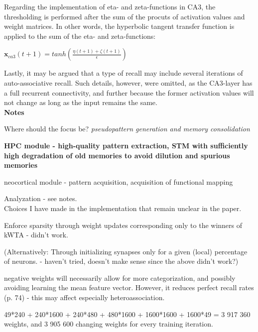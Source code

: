 Regarding the implementation of eta- and zeta-functions in CA3, the thresholding is performed after the sum of the procuts of activation values and weight matrices. In other words, the hyperbolic tangent transfer function is applied to the sum of the eta- and zeta-functions: 

\begin{center}
\begin{math}
    \textbf{x}_{ca3}(t+1) = tanh(\frac{\eta(t+1) + \zeta(t+1)}{\epsilon})
\end{math}
\end{center}

Lastly, it may be argued that a type of recall may include several iterations of auto-associative recall. Such details, however, were omitted, as the CA3-layer has a full recurrent connectivity, and further because the former activation values will not change as long as the input remains the same.
\\

\textbf{Notes}

Where should the focus be? \textit{pseudopattern generation and memory consolidation}

\textbf{HPC module - high-quality pattern extraction, STM with sufficiently high degradation of old memories to avoid dilution and spurious memories}

neocortical module - pattern acquisition, acquisition of functional mapping

Analyzation - see notes.
\\

Choices I have made in the implementation that remain unclear in the paper.

Enforce sparsity through weight updates corresponding only to the winners of kWTA - didn't work.

(Alternatively: Through initializing synapses only for a given (local) percentage of neurons. - haven't tried, doesn't make sense since the above didn't work?)

negative weights will necessarily allow for more categorization, and possibly avoiding learning the mean feature vector. However, it reduces perfect recall rates (p. 74) - this may affect especially heteroassociation.

49*240 + 240*1600 + 240*480 + 480*1600 + 1600*1600 + 1600*49 = 3 917 360 weights, and 3 905 600 changing weights for every training iteration.